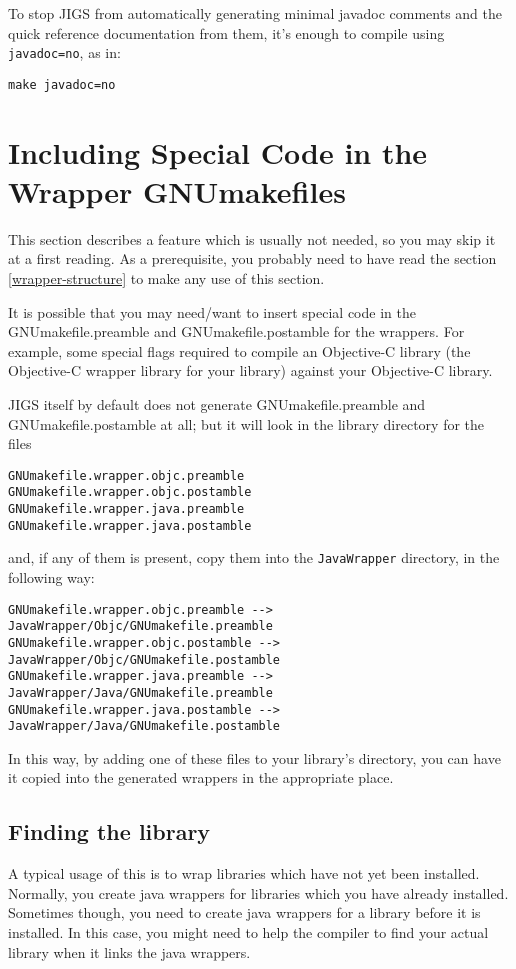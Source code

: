 To stop JIGS from automatically generating minimal javadoc comments
and the quick reference documentation from them, it's enough to
compile using \texttt{javadoc=no}, as in:
\begin{verbatim}
make javadoc=no
\end{verbatim}

\section{Including Special Code in the Wrapper GNUmakefiles}\label{special-code-in-GNUmakefiles}

This section describes a feature which is usually not needed, so you
may skip it at a first reading.  As a prerequisite, you probably need
to have read the section \ref{wrapper-structure} to make any use of
this section.

It is possible that you may need/want to insert special code in the
GNUmakefile.preamble and GNUmakefile.postamble for the wrappers.  For
example, some special flags required to compile an Objective-C library
(the Objective-C wrapper library for your library) against your
Objective-C library.

JIGS itself by default does not generate GNUmakefile.preamble and
GNUmakefile.postamble at all; but it will look in the library
directory for the files 
\begin{verbatim}
GNUmakefile.wrapper.objc.preamble
GNUmakefile.wrapper.objc.postamble
GNUmakefile.wrapper.java.preamble
GNUmakefile.wrapper.java.postamble
\end{verbatim}
and, if any of them is present, copy them into the \texttt{JavaWrapper} 
directory, in the following way:
\begin{verbatim}
GNUmakefile.wrapper.objc.preamble --> JavaWrapper/Objc/GNUmakefile.preamble
GNUmakefile.wrapper.objc.postamble --> JavaWrapper/Objc/GNUmakefile.postamble
GNUmakefile.wrapper.java.preamble --> JavaWrapper/Java/GNUmakefile.preamble
GNUmakefile.wrapper.java.postamble --> JavaWrapper/Java/GNUmakefile.postamble
\end{verbatim}

In this way, by adding one of these files to your library's directory,
you can have it copied into the generated wrappers in the appropriate
place.

\subsection{Finding the library}
A typical usage of this is to wrap libraries which have not yet been
installed.  Normally, you create java wrappers for libraries which you
have already installed.  Sometimes though, you need to create java
wrappers for a library before it is installed.  In this case, you
might need to help the compiler to find your actual library when it
links the java wrappers.

